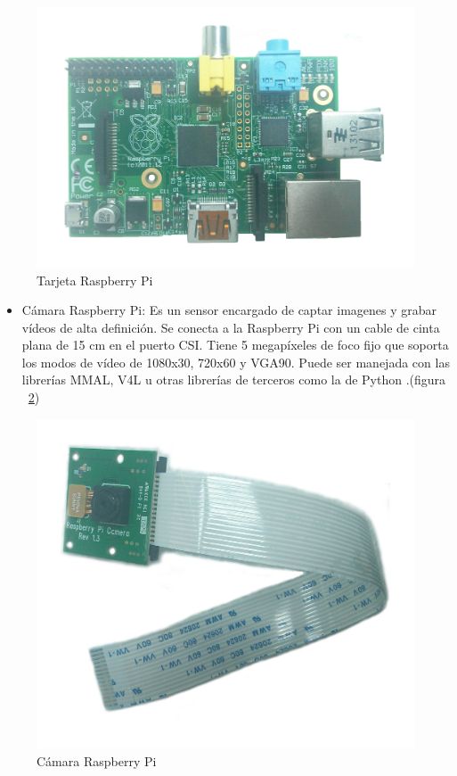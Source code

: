 \begin{figure}[hbtp]
\centering
\includegraphics[scale=0.06]{imagenes/RaspberryPi.jpg}
\caption{Tarjeta Raspberry Pi}
\label{fig:Raspe}
\end{figure}

\begin{itemize}
\item C\'amara Raspberry Pi: Es un sensor encargado de captar imagenes y grabar vídeos de alta definición. Se conecta a la Raspberry Pi con un cable de cinta plana de 15 cm en el puerto CSI. Tiene 5 megapíxeles de foco fijo que soporta los modos de vídeo de 1080x30, 720x60 y VGA90. Puede ser manejada con las librerías MMAL, V4L u otras librerías de terceros como la de Python \cite{raspberrycam}.(figura ~\ref{fig:came})  %

\end{itemize}

\begin{figure}[hbtp]
\centering
\includegraphics[scale=0.06]{imagenes/CamRasp.jpg}
\caption{C\'amara Raspberry Pi}
\label{fig:came}
\end{figure}


